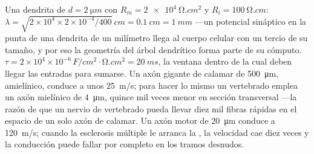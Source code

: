 \begin{example}\label{ex:b3:nervous-systems:numbers}
Una dendrita de $d = \qty{2}{\micro m}$ con $R_{m} = \qty{2e4}{\ohm.cm^2}$
y $R_{i} = \qty{100}{\ohm.cm}$: $\lambda = \sqrt{2\times 10^{4}\times
2\times 10^{-4}/400}\ \unit{cm} = \qty{0.1}{cm} = \qty{1}{mm}$ ---un
potencial sináptico en la punta de una dendrita de un milímetro llega
al cuerpo celular con un tercio de su tamaño, y por eso la geometría
del árbol dendrítico forma parte de su cómputo. $\tau = 2\times 10^{4}\times
10^{-6}\,\unit{F/cm^2}\cdot\unit{\ohm.cm^2} = \qty{20}{ms}$, la ventana
dentro de la cual deben llegar las entradas para sumarse. Un axón
gigante de calamar de \qty{500}{\micro m}, amielínico, conduce a unos
\qty{25}{m/s}; para hacer lo mismo un vertebrado emplea un axón
mielínico de \qty{4}{\micro m}, quince mil veces menor en sección
transversal ---la razón de que un nervio de vertebrado pueda llevar
diez mil fibras rápidas en el espacio de un solo axón de calamar. Un
axón motor de \qty{20}{\micro m} conduce a \qty{120}{m/s}; cuando la
esclerosis múltiple le arranca la , la velocidad cae diez veces
y la conducción puede fallar por completo en los tramos desnudos.
\end{example}

